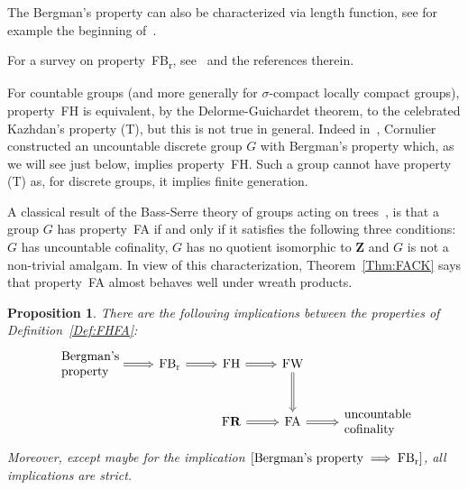 \documentclass[a4paper]{article}
\newtheorem{prop}[lem]{Proposition}
\theoremstyle{definition}
\newcommand*{\field}[1]{\mathbf{#1}}
\newcommand*{\Z}{\field{Z}}
\newcommand*{\FB}{FB\textsubscript{r}}
\newcommand*{\FH}{FH}
\newcommand*{\FW}{FW}
\newcommand*{\FA}{FA}
\newcommand*{\FR}{F\textbf{R}}
\begin{document}
The Bergman's property can also be characterized via length function, see for example the beginning of~\cite{MR4119107}.

For a survey on property~\FB, see~\cite{MR3382026} and the references therein.

For countable groups (and more generally for $\sigma$-compact locally compact groups), property~\FH{} is equivalent, by the Delorme-Guichardet theorem, to the celebrated Kazhdan's property (T), but this is not true in general.
Indeed in~\cite{MR2240370}, Cornulier constructed an uncountable discrete group $G$ with Bergman's property which, as we will see just below, implies property~\FH.
Such a group cannot have property (T) as, for discrete groups, it implies finite generation.

A classical result of the Bass-Serre theory of groups acting on trees~\cite{MR0476875}, is that a group $G$ has property~\FA{} if and only if it satisfies the following three conditions: $G$ has uncountable cofinality, $G$ has no quotient isomorphic to $\Z$ and $G$ is not a non-trivial amalgam.
In view of this characterization, Theorem~\ref{Thm:FACK} says that property~\FA{} almost behaves well under wreath products.
%
%
\begin{prop}
There are the following implications between the properties of Definition~\ref{Def:FHFA}:
\[
\begin{tikzcd}[arrows=Rightarrow]
\parbox{4.5em}{\textnormal{Bergman's property}}\arrow[r]	&\textnormal{\FB} \arrow[r]	&\textnormal{\FH} \arrow[r]	&\textnormal{\FW}\arrow[d] &\\%
&&\textnormal{\FR}\arrow[r]& \textnormal{\FA} \arrow[r]& \parbox{5em}{\textnormal{uncountable cofinality}}
\end{tikzcd}
\]
Moreover, except maybe for the implication $[\textnormal{Bergman's property}\implies\textnormal{\FB}]$, all implications are strict.%
\end{prop}
\end{document}
